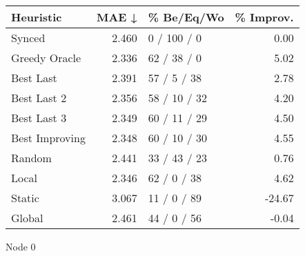 \begin{tabular}{lrlr}
\toprule
\textbf{Heuristic} & \textbf{MAE ↓} & \textbf{\% Be/Eq/Wo} & \textbf{\% Improv.} \\
\midrule
            Synced &          2.460 &          0 / 100 / 0 &                0.00 \\
     Greedy Oracle &          2.336 &          62 / 38 / 0 &                5.02 \\
         Best Last &          2.391 &          57 / 5 / 38 &                2.78 \\
       Best Last 2 &          2.356 &         58 / 10 / 32 &                4.20 \\
       Best Last 3 &          2.349 &         60 / 11 / 29 &                4.50 \\
    Best Improving &          2.348 &         60 / 10 / 30 &                4.55 \\
            Random &          2.441 &         33 / 43 / 23 &                0.76 \\
             Local &          2.346 &          62 / 0 / 38 &                4.62 \\
            Static &          3.067 &          11 / 0 / 89 &              -24.67 \\
            Global &          2.461 &          44 / 0 / 56 &               -0.04 \\
\bottomrule
\end{tabular}
\caption{Node 0}
\label{tab:ds_non_lr05_le1_bs2_0}
